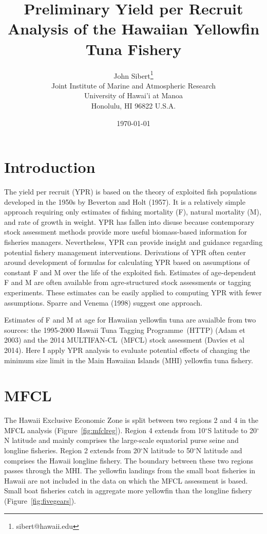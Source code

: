 \documentclass[12pt,letterpaper]{article}
\title{Preliminary Yield per Recruit Analysis of the Hawaiian
Yellowfin Tuna Fishery}
\author{
John Sibert\thanks{sibert@hawaii.edu}\\
Joint Institute of Marine and Atmospheric Research\\
University of Hawai'i at Manoa\\
Honolulu, HI  96822 U.S.A.\\[0.125in]
\date{\today}
}
\newcommand\doublespacing{\baselineskip=1.6\normalbaselineskip}
\renewcommand\deg[1]{$^\circ$#1}
\newcommand\MFCL{MULTIFAN-CL}
\newcommand\HTTP{Hawaii Tuna Tagging Programme}
\newcommand\help[1]{\color{Magenta}{\it #1 }\normalcolor}
\begin{document}
\maketitle

\doublespacing

\section*{Introduction}
The yield per recruit (YPR) is based on the theory of exploited fish
populations developed in the 1950s
by Beverton and Holt (1957). It is a relatively simple
approach requiring only estimates of fishing mortality (F), natural
mortality (M), and rate of growth in weight. YPR has fallen into
disuse because contemporary stock assessment methods provide more useful
biomass-based
information for fisheries managers. 
Nevertheless, YPR can provide insight and guidance regarding potential
fishery management interventions.
Derivations of
YPR often center around development of formulas for calculating YPR based on
assumptions of constant F and M over the life of the exploited fish.
Estimates of age-dependent F and M are often available from
agre-structured stock
assessments or tagging experiments. These estimates can be easily
applied to computing YPR with fewer assumptions. Sparre and Venema
(1998) suggest one approach.

Estimates of F and M at age for Hawaiian yellowfin tuna are avaialble
from two sources: the 1995-2000 \HTTP\ (HTTP) (Adam et 2003) and the
2014 \MFCL\ (MFCL) stock assessment (Davies et al 2014). Here I
apply YPR analysis to evaluate potential effects of changing the
minimum size limit in the Main Hawaiian Islands (MHI) yellowfin tuna
fishery.

\section*{MFCL}
The Hawaii Exclusive Economic Zone is split between two regions 2 and 4
in the MFCL analysis (Figure~\ref{fig:mfclreg}). 
Region 4 extends from
10\deg{S} latitude to 20\deg{N} latitude and mainly comprises 
the large-scale equatorial purse seine and longline fisheries.
Region 2 extends from 20\deg{N} latitude to 50\deg{N} latitude
and comprises the Hawaii longline fishery.
The boundary between these two regions passes through the MHI. 
The yellowfin landings from the small boat fisheries in Hawaii are not
included in the data on which the MFCL assessment is based.
Small boat fisheries catch in aggregate more yellowfin than the longline
fishery (Figure~\ref{fig:fivegears})\help{or simple table}.
\end{document}
